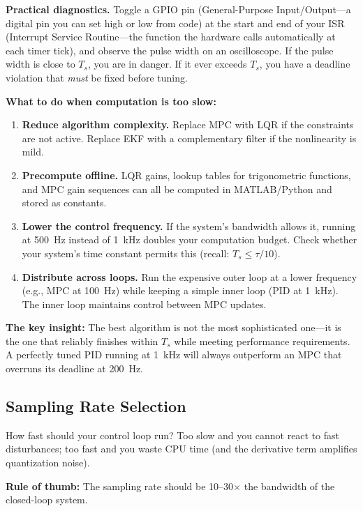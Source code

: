 \begin{mdframed}[linewidth=1pt, innertopmargin=10pt, innerbottommargin=10pt]
\textbf{Practical diagnostics.} Toggle a GPIO pin (General-Purpose Input/Output---a digital pin you can set high or low from code) at the start and end of your ISR (Interrupt Service Routine---the function the hardware calls automatically at each timer tick), and observe the pulse width on an oscilloscope. If the pulse width is close to $T_s$, you are in danger. If it ever exceeds $T_s$, you have a deadline violation that \textit{must} be fixed before tuning.

\textbf{What to do when computation is too slow:}
\begin{enumerate}[nosep]
    \item \textbf{Reduce algorithm complexity.} Replace MPC with LQR if the constraints are not active. Replace EKF with a complementary filter if the nonlinearity is mild.
    \item \textbf{Precompute offline.} LQR gains, lookup tables for trigonometric functions, and MPC gain sequences can all be computed in MATLAB/Python and stored as constants.
    \item \textbf{Lower the control frequency.} If the system's bandwidth allows it, running at 500~Hz instead of 1~kHz doubles your computation budget. Check whether your system's time constant permits this (recall: $T_s \leq \tau / 10$).
    \item \textbf{Distribute across loops.} Run the expensive outer loop at a lower frequency (e.g., MPC at 100~Hz) while keeping a simple inner loop (PID at 1~kHz). The inner loop maintains control between MPC updates.
\end{enumerate}

\textbf{The key insight:} The best algorithm is not the most sophisticated one---it is the one that reliably finishes within $T_s$ while meeting performance requirements. A perfectly tuned PID running at 1~kHz will always outperform an MPC that overruns its deadline at 200~Hz.
\end{mdframed}

\subsection{Sampling Rate Selection}

How fast should your control loop run? Too slow and you cannot react to fast disturbances; too fast and you waste CPU time (and the derivative term amplifies quantization noise).

\textbf{Rule of thumb:} The sampling rate should be 10--30$\times$ the bandwidth of the closed-loop system.


